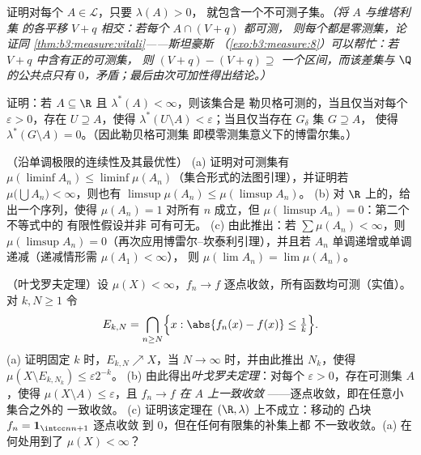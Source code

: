 \begin{exercise}[$\star\star\star$]\label{exo:b3:measure:9}
证明对每个 $A \in \mathcal L$，只要 $\lambda(A) > 0$，
就包含一个不可测子集。\emph{（将 $A$ 与维塔利集
的各平移 $V + q$ 相交：若每个 $A \cap (V+q)$ 都可测，
则每个都是零测集，论证同
\cref{thm:b3:measure:vitali}——斯坦豪斯
（\cref{exo:b3:measure:8}）可以帮忙：若 $V + q$ 中含有正的可测集，
则 $(V+q) - (V+q) \supseteq$
一个区间，而该差集与 $\Q$ 的公共点只有
$0$，矛盾；最后由次可加性得出结论。）}
\end{exercise}

\begin{exercise}[$\star\star$]\label{exo:b3:measure:10}
证明：若 $A \subseteq \R$ 且 $\lambda^*(A) < \infty$，则该集合是
勒贝格可测的，当且仅当对每个 $\varepsilon > 0$，存在
 $U \supseteq A$，使得 $\lambda^*(U \setminus A) <
\varepsilon$；当且仅当存在 $G_\delta$ 集 $G \supseteq A$，
使得 $\lambda^*(G\setminus A) = 0$。（因此勒贝格可测集
即模零测集意义下的博雷尔集。）
\end{exercise}

\begin{exercise}[$\star\star$]\label{exo:b3:measure:11}
（沿单调极限的连续性及其最优性）
(a) 证明对可测集有 $\mu(\liminf A_n) \leq
\liminf\mu(A_n)$（集合形式的法图引理），并证明若
$\mu\bigl(\bigcup A_n\bigr) < \infty$，则也有
$\limsup\mu(A_n) \leq \mu(\limsup A_n)$。
(b) 对 $\R$ 上的，给出一个序列，使得
$\mu(A_n) = 1$ 对所有 $n$ 成立，但 $\mu(\limsup A_n) = 0$：第二个不等式中的
有限性假设并非
可有可无。
(c) 由此推出：若 $\sum\mu(A_n) < \infty$，则
$\mu(\limsup A_n) = 0$（再次应用博雷尔–坎泰利引理），并且若
$A_n$ 单调递增或单调递减（递减情形需 $\mu(A_1) < \infty$），
则 $\mu(\lim A_n) = \lim\mu(A_n)$。
\end{exercise}

\begin{exercise}[$\star\star\star$]\label{exo:b3:measure:12}
（叶戈罗夫定理）设 $\mu(X) < \infty$，$f_n \to f$
逐点收敛，所有函数均可测（实值）。对 $k, N \geq 1$
令
\[
E_{k,N} = \bigcap_{n \geq N}\Bigl\{x : \abs{f_n(x) - f(x)}
\leq \tfrac1k\Bigr\} .
\]
(a) 证明固定 $k$ 时，$E_{k,N} \nearrow X$，当 $N \to
\infty$ 时，并由此推出 $N_k$，使得 $\mu(X \setminus E_{k,N_k})
\leq \varepsilon2^{-k}$。
(b) 由此得出\emph{叶戈罗夫定理}：对每个 $\varepsilon
> 0$，存在可测集 $A$，使得 $\mu(X\setminus A) \leq
\varepsilon$，且 $f_n \to f$ \emph{在 $A$ 上一致收敛}
——逐点收敛，即在任意小集合之外的
一致收敛。
(c) 证明该定理在 $(\R, \lambda)$ 上不成立：移动的
凸块 $f_n = \mathbf 1_{\intcc n{n+1}}$ 逐点收敛
到 $0$，但在任何有限集的补集上都
不一致收敛。(a) 在何处用到了 $\mu(X) < \infty$？
\end{exercise}

